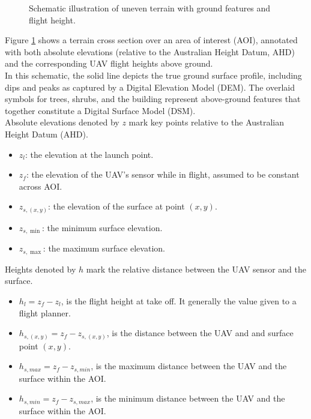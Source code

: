 \documentclass[11pt]{article}
\begin{document}
\begin{figure}[hbt]
  \caption{Schematic illustration of uneven terrain with ground features and flight height.}
  \label{fig:SurfaceElevation}
\end{figure}

\noindent
Figure \ref{fig:SurfaceElevation} shows a terrain cross section over an area of interest (AOI), annotated with both absolute elevations (relative to the Australian Height Datum, AHD) and the corresponding UAV flight heights above ground.\\


\noindent
In this schematic, the solid line depicts the true ground surface profile, including dips and peaks as captured by a Digital Elevation Model (DEM). The overlaid symbols for trees, shrubs, and the building represent above-ground features that together constitute a Digital Surface Model (DSM).\\

\noindent
Absolute elevations denoted by $z$ mark key points relative to the Australian Height Datum (AHD). 

\begin{itemize}[label={}]
    \item $z_l$: the elevation at the launch point.
    \item $z_f$: the elevation of the UAV's sensor while in flight, assumed to be constant across AOI.
    \item $z_{s,(x,y)}$: the elevation of the surface at point $(x,y)$.
    \item $z_{s,\min}$: the minimum surface elevation.
    \item $z_{s,\max}$: the maximum surface elevation.
\end{itemize}

Heights denoted by $h$ mark the relative distance between the UAV sensor and the surface. 

\begin{itemize}[label={}]
    \item $h_l = z_f - z_l$, is the flight height at take off. It generally the value given to a flight planner.
    \item $h_{s,(x,y)} = z_f - z_{s,(x,y)}$, is the distance between the UAV and and surface point $(x,y)$.
    \item $h_{s,max} = z_f - z_{s,min}$, is the maximum distance between the UAV and the surface within the AOI.
    \item $h_{s,min} = z_f - z_{s,max}$, is the minimum distance between the UAV and the surface within the AOI.
\end{itemize}
\end{document}
